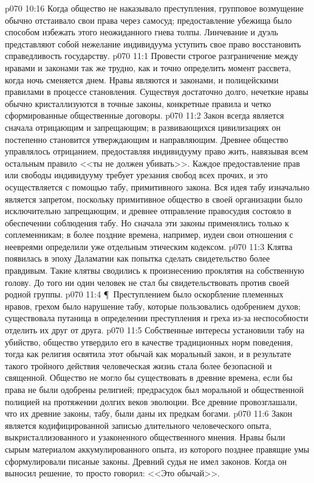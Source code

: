 \vs p070 10:16 Когда общество не наказывало преступления, групповое возмущение обычно отстаивало свои права через самосуд; предоставление убежища было способом избежать этого неожиданного гнева толпы. Линчевание и дуэль представляют собой нежелание индивидуума уступить свое право восстановить справедливость государству.
\vs p070 11:1 Провести строгое разграничение между нравами и законами так же трудно, как и точно определить момент рассвета, когда ночь сменяется днем. Нравы являются и законами, и полицейскими правилами в процессе становления. Существуя достаточно долго, нечеткие нравы обычно кристаллизуются в точные законы, конкретные правила и четко сформированные общественные договоры.
\vs p070 11:2 Закон всегда является сначала отрицающим и запрещающим; в развивающихся цивилизациях он постепенно становится утверждающим и направляющим. Древнее общество управлялось отрицанием, предоставляя индивидууму право жить, навязывая всем остальным правило <<ты не должен убивать>>. Каждое предоставление прав или свободы индивидууму требует урезания свобод всех прочих, и это осуществляется с помощью табу, примитивного закона. Вся идея табу изначально является запретом, поскольку примитивное общество в своей организации было исключительно запрещающим, и древнее отправление правосудия состояло в обеспечении соблюдения табу. Но сначала эти законы применялись только к соплеменникам; в более поздние времена, например, иудеи свои отношения с неевреями определили уже отдельным этическим кодексом.
\vs p070 11:3 Клятва появилась в эпоху Даламатии как попытка сделать свидетельство более правдивым. Такие клятвы сводились к произнесению проклятия на собственную голову. До того ни один человек не стал бы свидетельствовать против своей родной группы.
\vs p070 11:4 \P\ Преступлением было оскорбление племенных нравов, грехом было нарушение табу, которые пользовались одобрением духов; существовала путаница в определении преступления и греха из\hyp{}за неспособности отделить их друг от друга.
\vs p070 11:5 Собственные интересы установили табу на убийство, общество утвердило его в качестве традиционных норм поведения, тогда как религия освятила этот обычай как моральный закон, и в результате такого тройного действия человеческая жизнь стала более безопасной и священной. Общество не могло бы существовать в древние времена, если бы права не были одобрены религией; предрасудок был моральной и общественной полицией на протяжении долгих веков эволюции. Все древние провозглашали, что их древние законы, табу, были даны их предкам богами.
\vs p070 11:6 Закон является кодифицированной записью длительного человеческого опыта, выкристаллизованного и узаконенного общественного мнения. Нравы были сырым материалом аккумулированного опыта, из которого позднее правящие умы сформулировали писаные законы. Древний судья не имел законов. Когда он выносил решение, то просто говорил: <<Это обычай>>.
